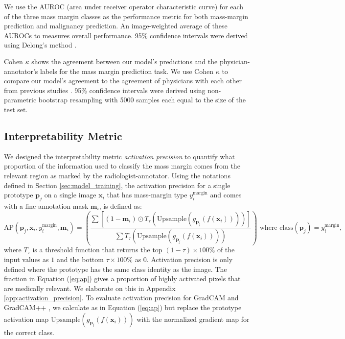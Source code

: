 \documentclass[11pt]{article}
\begin{document}
We use the AUROC (area under receiver operator characteristic curve) for each of the three mass margin classes as the performance metric for both mass-margin prediction and malignancy prediction. An image-weighted average of these AUROCs to measures overall performance. 95\% confidence intervals were derived using Delong's method \citep{delong1988comparing, sun2014fast}.

Cohen $\kappa$ shows the agreement between our model’s predictions and the physician-annotator's labels for the mass margin prediction task. We use Cohen $\kappa$ to compare our model's agreement to the agreement of physicians with each other from previous studies \citep{park2007observer, abdullah2009breast, baker1996breast, RAWASHDEH2018294, lazarus2006bi}. 95\% confidence intervals were derived using non-parametric bootstrap resampling with 5000 samples each equal to the size of the test set.

\subsection{Interpretability Metric}\label{subsec:activprec}

We designed the interpretability metric \textit{activation precision} to quantify what proportion of the information used to classify the mass margin comes from the relevant region as marked by the radiologist-annotator. Using the notations defined in Section \ref{sec:model_training}, the activation precision for a single prototype $\mathbf{p}_j$ on a single image $\mathbf{x}_i$ that has mass-margin type $y^{\text{margin}}_i$ and comes with a fine-annotation mask $\mathbf{m}_i$, is defined as:
\begin{equation}\label{eq:ap}
     \textrm{AP}(\mathbf{p}_j, \mathbf{x}_i, y^{\text{margin}}_i, \mathbf{m}_i) = \left(\frac{\sum \left[(1 - \mathbf{m}_i) \odot T_{\tau}\left(\textrm{Upsample}\left(g_{\mathbf{p}_j}(f(\mathbf{x}_i))\right)\right)\right]}{\sum T_{\tau}\left(\textrm{Upsample}\left(g_{\mathbf{p}_j}(f(\mathbf{x}_i))\right)\right)}\right)\text{ where } \text{class}(\mathbf{p}_j)=y^{\text{margin}}_i,
\end{equation}
where $T_{\tau}$ is a threshold function that returns the top $(1-\tau) \times 100\%$ of the input values as $1$ and the bottom $\tau \times 100\%$ as $0$. Activation precision is only defined where the prototype has the same class identity as the image. The fraction in Equation (\ref{eq:ap}) gives a proportion of highly activated pixels that are medically relevant. We elaborate on this in Appendix \ref{app:activation_precision}. To evaluate activation precision for GradCAM \cite{Selvaraju_2017_ICCV} and GradCAM++ \cite{chattopadhay2018grad}, we calculate as in Equation (\ref{eq:ap}) but replace the prototype activation map $\textrm{Upsample}\left(g_{\mathbf{p}_j}(f(\mathbf{x}_i))\right)$ with the normalized gradient map for the correct class.
\end{document}
